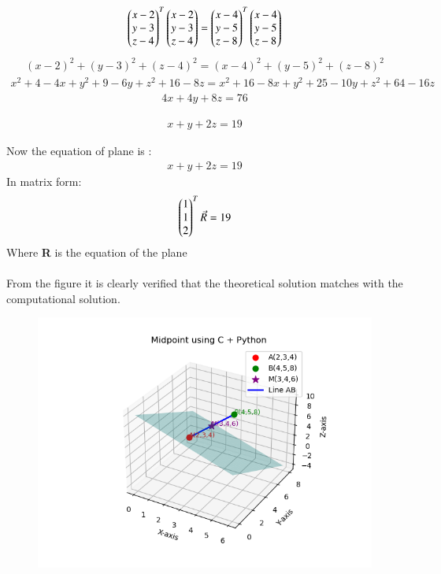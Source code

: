 \documentclass[journal]{IEEEtran}
\theoremstyle{remark}
\begin{document}
\begin{align}
    \begin{pmatrix}x-2\\y-3\\z-4\end{pmatrix}^T\begin{pmatrix}x-2\\y-3\\z-4\end{pmatrix}=\begin{pmatrix}x-4\\y-5\\z-8\end{pmatrix}^T\begin{pmatrix}x-4\\y-5\\z-8\end{pmatrix}
\end{align}
\begin{align}
(x-2)^2+(y-3)^2+(z-4)^2=(x-4)^2+(y-5)^2+(z-8)^2
\end{align}
\begin{align}
    x^2+4-4x+y^2+9-6y+z^2+16-8z=x^2+16-8x+y^2+25-10y+z^2+64-16z
\end{align}
\begin{align}
   4x+4y+8z=76
\end{align}

\begin{align}
     x+y+2z=19
\end{align}

Now the equation of plane is :
\begin{align}
     x+y+2z=19
\end{align}
In matrix form:
\begin{align}
     \begin{pmatrix}1\\1\\2\end{pmatrix}^T\Vec{R}=19
\end{align}
Where \textbf{R} is the equation of the plane\\\\



From the figure it is clearly verified that the theoretical solution matches with the computational solution.\\
\begin{figure}[h]
    \centering
    \includegraphics[height=0.5\textheight, keepaspectratio]{figs/figure1.png}
    \label{figure_1}
\end{figure}
\end{document}
